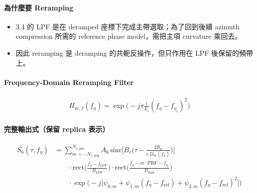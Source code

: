 \documentclass[11pt]{article}
\providecommand{\tightlist}{%
  \setlength{\itemsep}{0pt}\setlength{\parskip}{0pt}}
\begin{document}
\hypertarget{ux70baux4ec0ux9ebcux8981-reramping}{%
\paragraph{為什麼要
Reramping}\label{ux70baux4ec0ux9ebcux8981-reramping}}

\begin{itemize}
\tightlist
\item
  3.4 的 LPF 是在 deramped 座標下完成主帶選取；為了回到後續 azimuth
  compression 所需的 reference phase model，需把主項 curvature 乘回去。
\item
  因此 reramping 是 deramping 的共軛反操作，但只作用在 LPF
  後保留的頻帶上。
\end{itemize}

\hypertarget{frequency-domain-reramping-filter}{%
\paragraph{Frequency-Domain Reramping
Filter}\label{frequency-domain-reramping-filter}}

\begin{equation}
\begin{aligned}
H_{\mathrm{re},f}(f_\eta)=\exp\biggl(-j\pi\frac{1}{k_s}(f_\eta-f_{\eta_c})^2\biggr)
\end{aligned}
\end{equation}

\hypertarget{ux5b8cux6574ux8f38ux51faux5f0fux4fddux7559-replica-ux8868ux793a-1}{%
\paragraph{完整輸出式（保留 replica
表示）}\label{ux5b8cux6574ux8f38ux51faux5f0fux4fddux7559-replica-ux8868ux793a-1}}

\begin{equation}
\begin{aligned}
S_6(\tau,f_\eta)
&=
\sum_{m=-N_{s,\mathrm{neg}}}^{N_{s,\mathrm{pos}}} A_6\,
\mathrm{sinc}\biggl[ B_r\biggl( \tau-\frac{2R_0}{c\,D_m(f_\eta)} \biggr) \biggr]\\
&\qquad \cdot \mathrm{rect}\biggl( \frac{f_\eta-f_{\mathrm{LPF}}}{B_{\mathrm{LPF}}} \biggr)
\cdot \mathrm{rect}\biggl( \frac{f_\eta-m\cdot\mathrm{PRF}-f_{\eta_c}}{B_{\max}} \biggr)\\
&\qquad \cdot \exp\biggl( -j\biggl[ \psi_{0,m}+\psi_{1,m}(f_\eta-f_{\mathrm{ref}})+\psi_{2,m}(f_\eta-f_{\mathrm{ref}})^2 \biggr] \biggr)
\end{aligned}
\end{equation}
\end{document}
